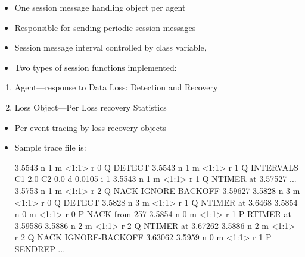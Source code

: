 \documentclass[landscape]{foils}
\begin{document}
\begin{comment}
\item each agent also receives its messages
\item relies on agent being able to receive its own messages
\end{comment}

\begin{itemize}
\item One session message handling object per agent
\item Responsible for sending periodic session messages
\item Session message interval controlled by class variable, 
\item Two types of session functions implemented:
\end{itemize}

\begin{comment}
\item advantages etc.
\end{comment}

\begin{enumerate}
\item Agent---response to Data Loss:  Detection and Recovery
\item Loss Object---Per Loss recovery Statistics 
\end{enumerate}

\begin{comment}
\item data loss measures ave-recovery delay, ave dups
\item used by adaptive algorithm to adjust the recovery parameters
\item Loss recovery objects write out to log file when they terminate
\end{comment}

\begin{itemize}
\item Per event tracing by loss recovery objects
\item Sample trace file is:
\begin{program}
 3.5543 n 1 m <1:1> r 0 Q DETECT
 3.5543 n 1 m <1:1> r 1 Q INTERVALS C1 2.0 C2 0.0 d 0.0105 i 1
 3.5543 n 1 m <1:1> r 1 Q NTIMER at 3.57527
 ...
 3.5753 n 1 m <1:1> r 2 Q NACK IGNORE-BACKOFF 3.59627
 3.5828 n 3 m <1:1> r 0 Q DETECT
 3.5828 n 3 m <1:1> r 1 Q NTIMER at 3.6468
 3.5854 n 0 m <1:1> r 0 P NACK from 257
 3.5854 n 0 m <1:1> r 1 P RTIMER at 3.59586
 3.5886 n 2 m <1:1> r 2 Q NTIMER at 3.67262
 3.5886 n 2 m <1:1> r 2 Q NACK IGNORE-BACKOFF 3.63062
 3.5959 n 0 m <1:1> r 1 P SENDREP
 ...
\end{program}
\end{itemize}
\end{document}
